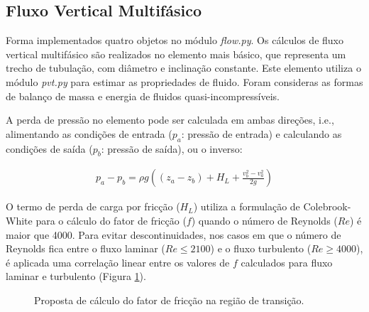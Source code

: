 \documentclass[final,5p]{elsarticle}
\numberwithin{equation}{section}
\begin{document}
    \subsection{Fluxo Vertical Multifásico}

        Forma implementados quatro objetos no módulo \emph{flow.py}. Os cálculos de fluxo vertical multifásico são realizados no elemento mais básico, que representa um trecho de tubulação, com diâmetro e inclinação constante. Este elemento utiliza o módulo \emph{pvt.py} para estimar as propriedades de fluido. Foram consideras as formas de balanço de massa e energia de fluidos quasi-incompressíveis.

        A perda de pressão no elemento pode ser calculada em ambas direções, i.e., alimentando as condições de entrada ($p_a$: pressão de entrada) e calculando as condições de saída ($p_b$: pressão de saída), ou o inverso:

        \begin{align}
            p_a - p_b = \rho g \left( (z_a - z_b) + H_L + \frac{v^2_b - v^2_a}{2 g}\right)
        \end{align}

        O termo de perda de carga por fricção ($H_L$) utiliza a formulação de Colebrook-White para o cálculo do fator de fricção ($f$) quando o número de Reynolds ($Re$) é maior que 4000. Para evitar descontinuidades, nos casos em que o número de Reynolds fica entre o fluxo laminar ($Re \leq 2100$) e o fluxo turbulento ($Re \geq 4000$), é aplicada uma correlação linear entre os valores de $f$ calculados para fluxo laminar e turbulento (Figura \ref{fig:friccao}).

        \begin{figure}[hbt!]
            \caption{Proposta de cálculo do fator de fricção na região de transição.}
            \label{fig:friccao}
        \end{figure}
\end{document}
